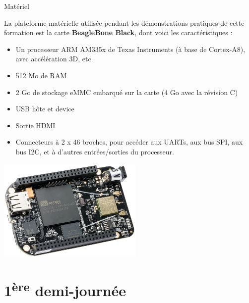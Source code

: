\documentclass[a4paper,12pt,obeyspaces,spaces,hyphens]{article}
\begin{document}
\feagendatwocolumn
{Matériel}
{
  La plateforme matérielle utilisée pendant les démonstrations pratiques de
  cette formation est la carte {\bf BeagleBone Black}, dont voici les
  caractéristiques :

  \begin{itemize}
  \item Un processeur ARM AM335x de Texas Instruments (à base de
    Cortex-A8), avec accélération 3D, etc.
  \item 512 Mo de RAM
  \item 2 Go de stockage eMMC embarqué sur la carte
	\newline(4 Go avec la révision C)
  \item USB hôte et device
  \item Sortie HDMI
  \item Connecteurs à 2 x 46 broches, pour accéder aux UARTs, aux
        bus SPI, aux bus I2C, et à d'autres entrées/sorties du
        processeur.
  \end{itemize}
}
{}
{
  \begin{center}
    \includegraphics[height=5cm]{../slides/beagleboneblack-board/beagleboneblack.png}
  \end{center}
}

\section{1\textsuperscript{ère} demi-journée}
\end{document}
